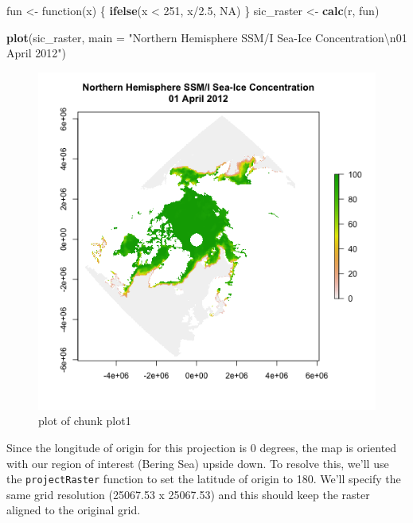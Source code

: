 \documentclass[]{article}
\makeatletter
\newenvironment{Shaded}{}{}
\newcommand{\KeywordTok}[1]{\textcolor[rgb]{0.00,0.44,0.13}{\textbf{{#1}}}}
\newcommand{\DataTypeTok}[1]{\textcolor[rgb]{0.56,0.13,0.00}{{#1}}}
\newcommand{\DecValTok}[1]{\textcolor[rgb]{0.25,0.63,0.44}{{#1}}}
\newcommand{\FloatTok}[1]{\textcolor[rgb]{0.25,0.63,0.44}{{#1}}}
\newcommand{\CharTok}[1]{\textcolor[rgb]{0.25,0.44,0.63}{{#1}}}
\newcommand{\StringTok}[1]{\textcolor[rgb]{0.25,0.44,0.63}{{#1}}}
\newcommand{\OtherTok}[1]{\textcolor[rgb]{0.00,0.44,0.13}{{#1}}}
\newcommand{\NormalTok}[1]{{#1}}
\def\maxwidth{\ifdim\Gin@nat@width>\linewidth\linewidth
\else\Gin@nat@width\fi}
\let\Oldincludegraphics\includegraphics
\renewcommand{\includegraphics}[1]{\Oldincludegraphics[width=\maxwidth]{#1}}
\makeatother
\begin{document}
\begin{Shaded}
\begin{Highlighting}[]
\NormalTok{fun <- function(x) \{}
    \KeywordTok{ifelse}\NormalTok{(x < }\DecValTok{251}\NormalTok{, x/}\FloatTok{2.5}\NormalTok{, }\OtherTok{NA}\NormalTok{)}
\NormalTok{\}}
\NormalTok{sic_raster <- }\KeywordTok{calc}\NormalTok{(r, fun)}
\end{Highlighting}
\end{Shaded}
\begin{Shaded}
\begin{Highlighting}[]
\KeywordTok{plot}\NormalTok{(sic_raster, }\DataTypeTok{main =} \StringTok{"Northern Hemisphere SSM/I Sea-Ice Concentration}\CharTok{\textbackslash{}n}\StringTok{01 April 2012"}\NormalTok{)}
\end{Highlighting}
\end{Shaded}
\begin{figure}[htbp]
\centering
\includegraphics{figure/plot1.png}
\caption{plot of chunk plot1}
\end{figure}

Since the longitude of origin for this projection is 0 degrees, the map
is oriented with our region of interest (Bering Sea) upside down. To
resolve this, we'll use the \texttt{projectRaster} function to set the
latitude of origin to 180. We'll specify the same grid resolution
(25067.53 x 25067.53) and this should keep the raster aligned to the
original grid.
\end{document}

